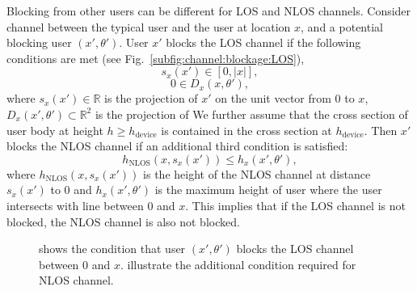 \documentclass[10pt, conference, letterpaper]{IEEEtran}
\DeclareMathOperator*{\NLOS}{\mathrm{NLOS}}
\begin{document}
Blocking from other users can be different for LOS and NLOS channels. 
Consider channel between the typical user and the user at location $x$, and a potential blocking user $(x', \theta')$.
User $x'$ blocks the LOS channel if the following conditions are met (see Fig.~\ref{subfig:channel:blockage:LOS}), 
\begin{equation*}
s_x(x')\in [0,|x|],
\end{equation*}
\begin{equation*}
0 \in D_x(x, \theta'),
\end{equation*}
where $s_x(x')\in \mathbb{R}$ is the projection of $x'$ on the unit vector from 0 to $x$, $D_x(x', \theta')\subset \mathbb{R}^2$ is the projection of  
We further assume that the cross section of user body at height $h\geq h_{\mathrm{device}}$
is contained in the cross section at $h_{\mathrm{device}}$.
Then $x'$ blocks the NLOS channel if an additional third condition is satisfied:
\begin{equation*}
h_{\NLOS}(x, s_x(x')) \leq h_x(x', \theta'),
\end{equation*}
where $h_{\NLOS}(x, s_x(x'))$ is the height of the NLOS channel at distance $s_x(x')$ to $0$ and $h_x(x', \theta')$ is the maximum height of user where the user intersects with line between 0 and $x$.
This implies that if the LOS channel is not blocked, the NLOS channel is also not blocked. 


\begin{figure}[hbt]
	\centering
	 \hfill
	\caption[]{ shows the condition that user $(x', \theta')$ blocks the LOS channel between $0$ and $x$.  illustrate the additional condition required for NLOS channel.}
	\label{fig:channel:blockage}
\end{figure}
\end{document}
